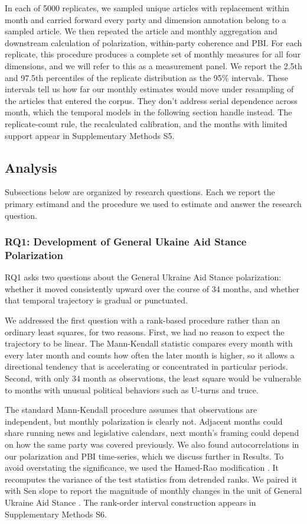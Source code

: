 In each of 5000 replicates, we sampled unique articles with replacement within month and carried forward every party and dimension annotation belong to a sampled article. We then repeated the article and monthly aggregation and downstream calculation of polarization, within-party coherence and PBI. For each replicate, this procedure produces a complete set of monthly measures for all four dimensions, and we will refer to this as a measurement panel. We report the 2.5th and 97.5th percentiles of the replicate distribution as the 95\% intervals. These intervals tell us how far our monthly estimates would move under resampling of the articles that entered the corpus. They don't address serial dependence across month, which the temporal models in the following section handle instead. The replicate-count rule, the recalculated calibration, and the months with limited support appear in Supplementary Methods S5.

\subsection{Analysis}

Subsections below are organized by research questions. Each we report the primary estimand and the procedure we used to estimate and answer the research question.

\subsubsection{RQ1: Development of General Ukaine Aid Stance Polarization}

RQ1 asks two questions about the General Ukraine Aid Stance polarization: whether it moved consistently upward over the course of 34 months, and whether that temporal trajectory is gradual or punctuated.

We addressed the first question with a rank-based procedure rather than an ordinary least squares, for two reasons. First, we had no reason to expect the trajectory to be linear. The Mann-Kendall statistic compares every month with every later month and counts how often the later month is higher, so it allows a directional tendency that is accelerating or concentrated in particular periods. Second, with only 34 month as observations, the least square would be vulnerable to months with unusual political behaviors such as U-turns and truce.

The standard Mann-Kendall procedure assumes that observations are independent, but monthly polarization is clearly not. Adjacent months could share running news and legislative calendars, next month's framing could depend on how the same party was covered previously. We also found autocorrelations in our polarization and PBI time-series, which we discuss further in Results. To avoid overstating the significance, we used the Hamed-Rao modification \citep{hamedModifiedMannKendallTrend1998}. It recomputes the variance of the test statistics from detrended ranks. We paired it with Sen slope to report the magnitude of monthly changes in the unit of General Ukraine Aid Stance \citep{senEstimatesRegressionCoefficient1968}. The rank-order interval construction appears in Supplementary Methods S6.

